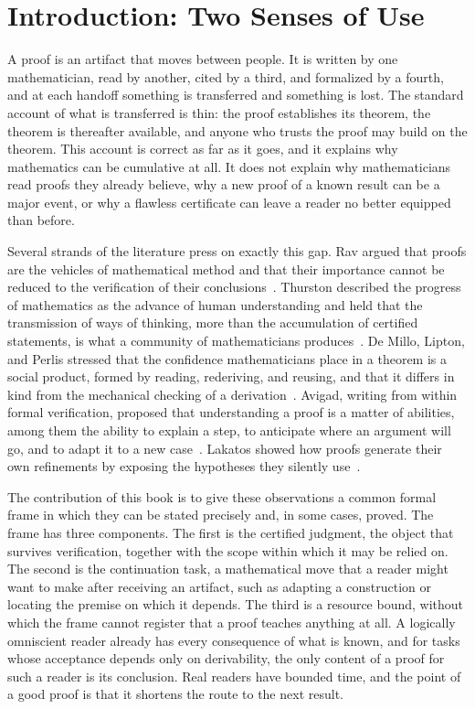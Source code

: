 \documentclass[11pt]{book}
\theoremstyle{definition}
\theoremstyle{remark}
\begin{document}
\tableofcontents

\mainmatter

\chapter{Introduction: Two Senses of Use}

A proof is an artifact that moves between people. It is written by one mathematician, read by another, cited by a third, and formalized by a fourth, and at each handoff something is transferred and something is lost. The standard account of what is transferred is thin: the proof establishes its theorem, the theorem is thereafter available, and anyone who trusts the proof may build on the theorem. This account is correct as far as it goes, and it explains why mathematics can be cumulative at all. It does not explain why mathematicians read proofs they already believe, why a new proof of a known result can be a major event, or why a flawless certificate can leave a reader no better equipped than before.

Several strands of the literature press on exactly this gap. Rav argued that proofs are the vehicles of mathematical method and that their importance cannot be reduced to the verification of their conclusions~\cite{rav}. Thurston described the progress of mathematics as the advance of human understanding and held that the transmission of ways of thinking, more than the accumulation of certified statements, is what a community of mathematicians produces~\cite{thurston}. De Millo, Lipton, and Perlis stressed that the confidence mathematicians place in a theorem is a social product, formed by reading, rederiving, and reusing, and that it differs in kind from the mechanical checking of a derivation~\cite{demillo}. Avigad, writing from within formal verification, proposed that understanding a proof is a matter of abilities, among them the ability to explain a step, to anticipate where an argument will go, and to adapt it to a new case~\cite{avigad}. Lakatos showed how proofs generate their own refinements by exposing the hypotheses they silently use~\cite{lakatos}.

The contribution of this book is to give these observations a common formal frame in which they can be stated precisely and, in some cases, proved. The frame has three components. The first is the certified judgment, the object that survives verification, together with the scope within which it may be relied on. The second is the continuation task, a mathematical move that a reader might want to make after receiving an artifact, such as adapting a construction or locating the premise on which it depends. The third is a resource bound, without which the frame cannot register that a proof teaches anything at all. A logically omniscient reader already has every consequence of what is known, and for tasks whose acceptance depends only on derivability, the only content of a proof for such a reader is its conclusion. Real readers have bounded time, and the point of a good proof is that it shortens the route to the next result.
\end{document}
